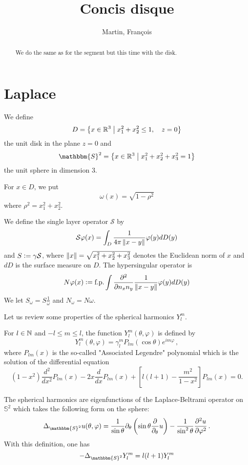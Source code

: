 \documentclass[]{article}
\title{Concis disque}
\author{Martin, François}
\begin{document}
\maketitle

\begin{abstract}
	We do the same as for the segment but this time with the disk.
\end{abstract}

\section{Laplace}

We define 
$$D = \left\{x \in \mathbb{R}^3\mathrel{}\middle|\mathrel{} x_1^2 + x_2^2 \leq  1,\quad  z = 0\right\}$$ 
the unit disk in the plane $z = 0$ and 
$$\mathbbm{S}^2 = \enstq{x \in \R^3}{x_1^2 + x_2^2 + x_3^2 = 1}$$
the unit sphere in dimension $3$. 

\begin{Def}
	For $x \in D$, we put 
	\[\omega(x) = \sqrt{1 - \rho^2}\]
	where $\rho^2 = x_1^2 + x_2^2$. 
	
	We define the single layer operator $\mathcal{S}$ by 
	\begin{equation}
		\mathcal{S \varphi}(x) = \int_{D} \frac{1}{4\pi \left\|x - y\right\|}\varphi(y) dD(y)
		\label{defS}
	\end{equation}
	and $S \mathrel{\mathop:}= \gamma \mathcal{S}$, where $\left\|x\right\| = \sqrt{x_1^2 + x_2^2 + x_3^2}$ denotes the Euclidean norm of $x$ and $dD$ is the surface measure on $D$. The hypersingular operator is
	\begin{equation}
		N \varphi(x) \mathrel{\mathop:}= \textup{f.p.} \int \frac{\partial^2}{\partial n_x n_y}\frac{1}{\left\|x - y\right\|} \varphi(y) dD(y) 
		\label{defN}
	\end{equation}
	We let $S_\omega = S \frac{1}{\omega}$ and $N_\omega = N \omega$.
\end{Def}

Let us review some properties of the spherical harmonics $Y_{l}^m$. 

\begin{Def}
	For $l \in \mathbb{N}$ and $- l \leq m \leq l$, the function $Y_l^m(\theta,\varphi)$ is defined by 
	\[Y_{l}^m(\theta,\varphi) = \gamma_l^m P_{lm}(\cos\theta) e^{im\varphi}\,,\]
	where $P_{lm}(x)$ is the so-called "Associated Legendre" polynomial which is the solution of the differential equation 
	\[(1 - x^2)\frac{d^2}{dx^2}P_{lm}(x) - 2 x \frac{d}{dx} P_{lm}(x) + \left[l(l+1) - \frac{m^2}{1 - x^2} \right] P_{lm} (x) = 0.\]
	
	The spherical harmonics are eigenfunctions of the Laplace-Beltrami operator on $\mathbb{S}^2$ which takes the following form on the sphere: 
	\[\Delta_{\mathbbm{S}^2} u(\theta,\varphi) = \frac{1}{\sin\theta} \partial_\theta \left(\sin\theta \frac{\partial}{\partial_{\theta}} u\right) - \frac{1}{\sin^2 \theta} \frac{\partial^2 u}{\partial \varphi^2}\,.\]
	With this definition, one has
	\[-\Delta_{\mathbbm{S}^2} Y_{l}^m = l(l+1) Y_{l}^m \] 
\end{Def}
\end{document}
